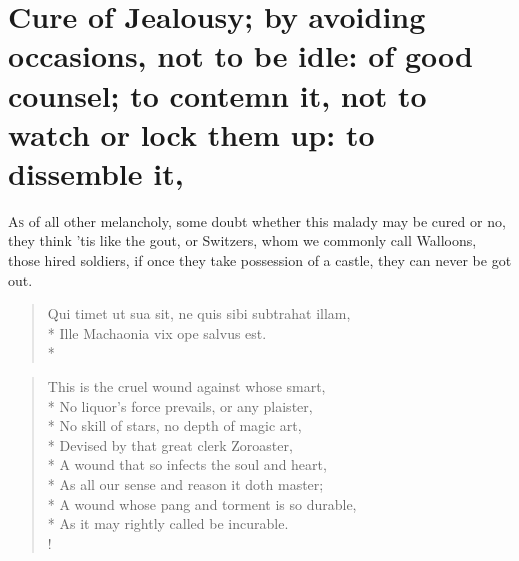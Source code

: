 \section[Cure of Jealousy: by avoiding it]{Cure of Jealousy; by avoiding occasions, not to be idle: of good counsel; to contemn it, not to watch or lock them up: to dissemble it, \etc{}}

\lettrine{A}{s} of all other melancholy, some doubt whether this malady may be cured
or no, they think 'tis like the gout, or Switzers, whom we
commonly call Walloons, those hired soldiers, if once they take
possession of a castle, they can never be got out.
%
\begin{latin}
\begin{verse}%
Qui timet ut sua sit, ne quis sibi subtrahat illam,\\*
Ille Machaonia vix ope salvus est.\\*
\end{verse}%
\end{latin}

\begin{verse}%
This is the cruel wound against whose smart,\\*
No liquor's force prevails, or any plaister,\\*
No skill of stars, no depth of magic art,\\*
Devised by that great clerk Zoroaster,\\*
A wound that so infects the soul and heart,\\*
As all our sense and reason it doth master;\\*
A wound whose pang and torment is so durable,\\*
As it may rightly called be incurable.\\!
\end{verse}%
%

